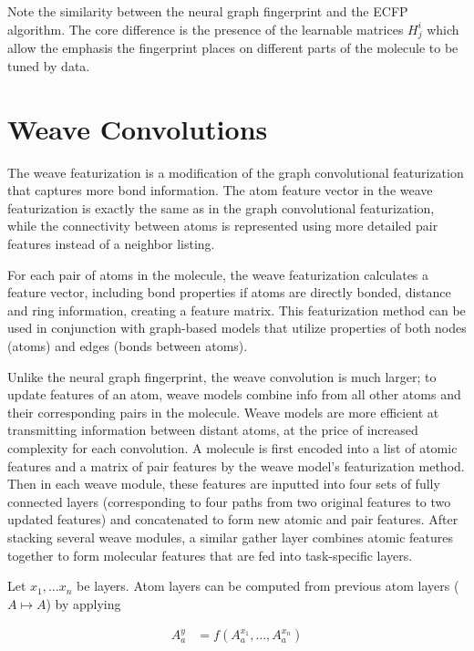 \documentclass[book.tex]{subfiles}
\begin{document}
Note the similarity between the neural graph fingerprint and the ECFP algorithm. The core difference is the presence of the learnable matrices $H^i_j$ which allow the emphasis the fingerprint places on different parts of the molecule to be tuned by data.

\section{Weave Convolutions}

The weave featurization \cite{kearnes2016molecular} is a modification of the graph convolutional featurization that captures more bond information. The atom feature vector in the weave featurization is exactly the same as in the graph convolutional featurization, while the connectivity between atoms is represented using more detailed pair features instead of a neighbor listing. 

For each pair of atoms in the molecule, the weave featurization calculates a feature vector, including bond properties if atoms are directly bonded, distance and ring information, creating a feature matrix. This featurization method can be used in conjunction with graph-based models that utilize properties of both nodes (atoms) and edges (bonds between atoms).

Unlike the neural graph fingerprint, the weave convolution is much larger; to update features of an atom, weave models combine info from all other atoms and their corresponding pairs in the molecule. Weave models are more efficient at transmitting information between distant atoms, at the price of increased complexity for each convolution. A molecule is first encoded into a list of atomic features and a matrix of pair features by the weave model's featurization method. Then in each weave module, these features are inputted into four sets of fully connected layers (corresponding to four paths from two original features to two updated features) and concatenated to form new atomic and pair features. After stacking several weave modules, a similar gather layer combines atomic features together to form molecular features that are fed into task-specific layers.

Let $x_1,\dotsc x_n$ be layers. Atom layers can be computed from previous atom layers ($A \mapsto A$) by applying

\begin{align}
    A^y_a &= f(A^{x_1}_a,\dotsc,A^{x_n}_a)
\end{align}
\end{document}
